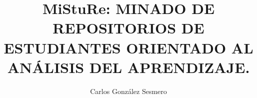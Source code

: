 \documentclass[a4paper, 12pt]{book}
\title{MiStuRe: MINADO DE REPOSITORIOS DE ESTUDIANTES ORIENTADO AL ANÁLISIS DEL APRENDIZAJE.}
\author{Carlos González Sesmero}
\begin{document}
\renewcommand{\refname}{Bibliografía}  %
\renewcommand{\appendixname}{Apéndice}









 



\cleardoublepage
{} %











\end{document}
